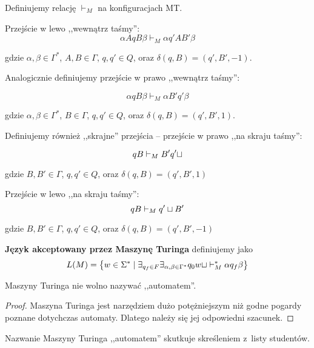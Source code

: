 \begin{definition}
    Definiujemy relację \( \vdash_M \) na konfiguracjach MT.
    
    Przejście w lewo ,,wewnątrz taśmy'':
    \[
        \alpha A q B \beta 
        \vdash_M
        \alpha q' A B' \beta
    \]
    
    gdzie \(\alpha, \beta \in \Gamma^*\), \(A, B \in \Gamma\), \(q, q'\in Q\), oraz \(\delta(q, B) = (q', B', -1)\).
    
    Analogicznie definiujemy przejście w prawo ,,wewnątrz taśmy'':

       \[
        \alpha q B \beta 
        \vdash_M
        \alpha B' q' \beta
    \]
    
    gdzie \(\alpha, \beta \in \Gamma^*\), \(B \in \Gamma\), \(q, q'\in Q\), oraz \(   \delta(q, B) = (q', B', 1) \).
    
    Definiujemy również ,,skrajne'' przejścia -- przejście w prawo ,,na skraju taśmy'':
    
    \[ 
        q B 
        \vdash_M
        B' q' \sqcup 
    \]
    
    gdzie \(B, B' \in \Gamma\), \(q, q' \in Q\), oraz \( \delta(q, B) = (q', B', 1) \)

    Przejście w lewo ,,na skraju taśmy'':
    \[
         q B 
        \vdash_M
        q' \sqcup B' 
    \]
    
    gdzie \(B, B' \in \Gamma\), \(q, q' \in Q\), oraz \( \delta(q, B) = (q', B', -1)\)

    
\end{definition}


\begin{definition}
    \textbf{Język akceptowany przez Maszynę Turinga} definiujemy jako
    \[
        L(M) = \set{w \in \Sigma^* \mid \exists_{q_f \in F} \exists_{\alpha, \beta \in \Gamma^*} q_0w\blank \vdash_M^* \alpha q_f \beta}
    \]
\end{definition}

\begin{theorem}
    Maszyny Turinga nie wolno nazywać ,,automatem''.
\end{theorem}
\begin{proof}
    Maszyna Turinga jest narzędziem dużo potężniejszym niż godne pogardy poznane dotychczas automaty. Dlatego należy się jej odpowiedni szacunek.
\end{proof}
\begin{corollary}
    Nazwanie Maszyny Turinga ,,automatem'' skutkuje skreśleniem z~listy studentów.
\end{corollary}